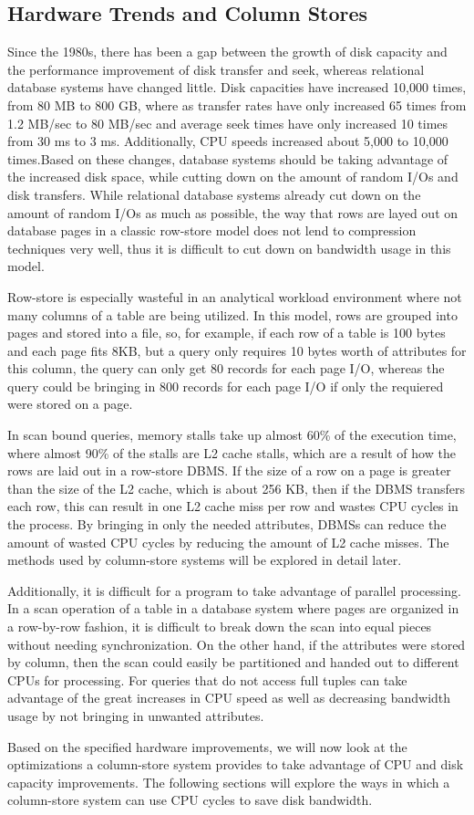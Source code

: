 \subsection*{Hardware Trends and Column Stores}


Since the 1980s, there has been a gap between the growth of disk capacity and the performance improvement of disk transfer and seek, whereas relational database systems have changed little. Disk capacities have increased 10,000 times, from 80 MB to 800 GB, where as transfer rates have only increased 65 times from 1.2 MB/sec to 80 MB/sec and average seek times have only increased 10 times from 30 ms to 3 ms\cite{slides}. Additionally, CPU speeds increased about 5,000 to 10,000 times\cite{now}.Based on these changes, database systems should be taking advantage of the increased disk space, while cutting down on the amount of random I/Os and disk transfers. While relational database systems already cut down on the amount of random I/Os as much as possible, the way that rows are layed out on database pages in a classic row-store model does not lend to compression techniques very well, thus it is difficult to cut down on bandwidth usage in this model. 


Row-store is especially wasteful in an analytical workload environment where not many columns of a table are being utilized. In this model, rows are grouped into pages and stored into a file, so, for example, if each row of a table is 100 bytes and each page fits 8KB, but a query only requires 10 bytes worth of attributes for this column, the query can only get 80 records for each page I/O, whereas the query could be bringing in 800 records for each page I/O if only the requiered were stored on a page.


In scan bound queries, memory stalls take up almost 60\% of the execution time, where almost 90\% of the stalls are L2 cache stalls, which are a result of how the rows are laid out in a row-store DBMS. If the size of a row on a page is greater than the size of the L2 cache, which is about 256 KB, then if the DBMS transfers each row, this can result in one L2 cache miss per row and wastes CPU cycles in the process\cite{slides}. By bringing in only the needed attributes, DBMSs can reduce the amount of wasted CPU cycles by reducing the amount of L2 cache misses. The methods used by column-store systems will be explored in detail later.


Additionally, it is difficult for a program to take advantage of parallel processing. In a scan operation of a table in a database system where pages are organized in a row-by-row fashion, it is difficult to break down the scan into equal pieces without needing synchronization. On the other hand, if the attributes were stored by column, then the scan could easily be partitioned and handed out to different CPUs for processing\cite{CPU}. For queries that do not access full tuples can take advantage of the great increases in CPU speed as well as decreasing bandwidth usage by not bringing in unwanted attributes.


Based on the specified hardware improvements, we will now look at the optimizations a column-store system provides to take advantage of CPU and disk capacity improvements. The following sections will explore the ways in which a column-store system can use CPU cycles to save disk bandwidth. 

